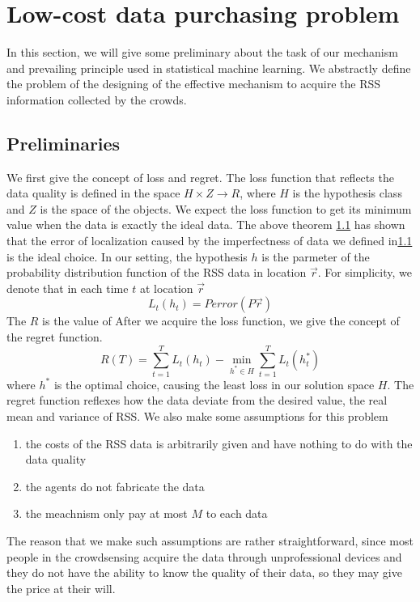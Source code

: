 \documentclass[10pt,conference,compsocconf,letterpaper]{IEEEtran}
\begin{document}
\section{Low-cost data purchasing problem}\label{probdef}
In this section, we will give some preliminary about the task of our mechanism and prevailing principle used in statistical machine learning. We abstractly define the problem of the designing of the effective mechanism to acquire the RSS information collected by the crowds. 

\subsection{Preliminaries}
We first give the concept of loss and regret. The loss function that reflects the data quality is defined in the space $H\times Z\to R$, where $H$ is the hypothesis class and $Z$ is the space of the objects. We expect the loss function to get its minimum value when the data is exactly the ideal data. The above theorem \ref{} has shown that the error of localization caused by the imperfectness of data we defined in\ref{} is the ideal choice. In our setting, the hypothesis $h$ is the parmeter of the probability distribution function of the RSS data in location $\vec r$. For simplicity, we denote that in each time $t$ at location $\vec r$
\begin{equation}
L_t(h_t)=Perror(P\vec r )
\end{equation}
 The $R$ is the value of After we acquire the loss function, we give the concept of the regret function.
\begin{equation}\label{def:reg}
R(T)=\sum_{t=1}^TL_t(h_t)-\min_{h^*\in H}\sum_{t=1}^TL_t(h^*_t)
\end{equation}
where $h^*$ is the optimal choice, causing the least loss in our solution space $H$. The regret function reflexes how the data deviate from the desired value, the real mean and variance of RSS. We also make some assumptions for this problem
\begin{enumerate}
\item the costs of the RSS data is arbitrarily given and have nothing to do with the data quality
\item the agents do not fabricate the data
\item the meachnism only pay at most $M$ to each data
\end{enumerate}
The reason that we make such assumptions are rather straightforward, since most people in the crowdsensing acquire the data through unprofessional devices and they do not have the ability to know the quality of their data, so they may give the price at their will. 
\end{document}
